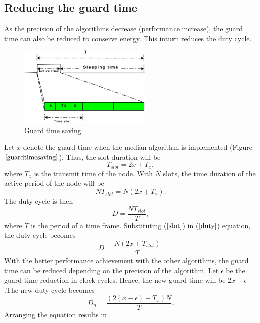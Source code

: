 \documentclass[journal]{IEEEtran}
\begin{document}
\subsection{\textbf{Reducing the guard time}}
As the precision of the algorithms decrease (performance increase),
the guard time can also be reduced to conserve energy. This inturn
reduces the duty cycle.
\begin{figure}[b]
\centering
\includegraphics[width=2.5in]{guardtimesaving}
\caption{Guard time saving} \label{guardtimesaving}
\end{figure}
\newline Let $x$ denote the guard time when the median algorithm is
implemented (Figure $\ref{guardtimesaving}$). Thus, the slot
duration will be
\begin{equation}
T_{slot}=2x + T_x ,
\end{equation}
where $T_x$ is the transmit time of the node. \newline With $N$
slots, the time duration of the active period of the node will be
\begin{equation}
NT_{slot}=N(2x + T_x). \label{slot}
\end{equation}
The duty cycle is then
\begin{equation}
D = \frac{NT_{slot}}{T}, \label{duty}
\end{equation}
where $T$ is the period of a time frame. \newline Substituting
($\ref{slot}$) in ($\ref{duty}$) equation, the duty cycle becomes
\begin{equation}
D= \frac{N(2x+T_{slot})}{T}.
\end{equation}
With the better performance achievement with the other algorithms,
the guard time can be reduced depending on the precision of the
algorithm. Let $\epsilon$ be the guard time reduction in clock
cycles. Hence, the new guard time will be $2x-\epsilon$.\newline The
new duty cycle becomes
\begin{equation}
D_n=\frac{(2(x-\epsilon)+T_x)N}{T}.
\end{equation}
Arranging the equation results in
\end{document}

